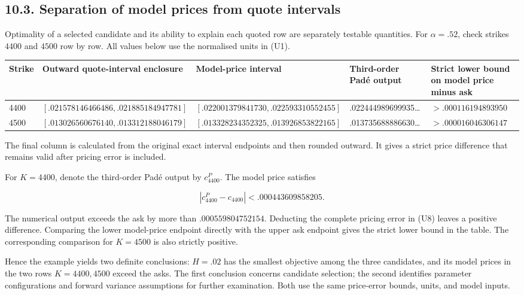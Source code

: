 \documentclass[a4paper,11pt]{article}
\begin{document}
\subsection*{10.3. Separation of model prices from quote intervals}

Optimality of a selected candidate and its ability to explain each quoted row are separately testable quantities. For $\alpha=.52$, check strikes $4400$ and $4500$ row by row. All values below use the normalised units in (U1).

\begingroup\scriptsize\setlength{\tabcolsep}{3pt}
\begin{longtable}{L{0.178000\textwidth}L{0.178000\textwidth}L{0.178000\textwidth}L{0.178000\textwidth}L{0.178000\textwidth}}
Strike & Outward quote-interval enclosure & Model-price interval & Third-order Padé output & Strict lower bound on model price minus ask\\
 & $[.021578146466486,.021885184947781]$ & $[.022001379841730,.022593310552455]$ & .022444989699935… & $>.000116194893950$\\
4500 & $[.013026560676140,.013312188046179]$ & $[.013328234352325,.013926853822165]$ & .013735688886630… & $>.000016046306147$\\
\end{longtable}\endgroup

The final column is calculated from the original exact interval endpoints and then rounded outward. It gives a strict price difference that remains valid after pricing error is included.

For $K=4400$, denote the third-order Padé output by $c^P_{4400}$. The model price satisfies

\[
|c^P_{4400}-c_{4400}|
<.000443609858205.
\tag{U8}
\]

The numerical output exceeds the ask by more than $.000559804752154$. Deducting the complete pricing error in (U8) leaves a positive difference. Comparing the lower model-price endpoint directly with the upper ask endpoint gives the strict lower bound in the table. The corresponding comparison for $K=4500$ is also strictly positive.

Hence the example yields two definite conclusions: $H=.02$ has the smallest objective among the three candidates, and its model prices in the two rows $K=4400,4500$ exceed the asks. The first conclusion concerns candidate selection; the second identifies parameter configurations and forward variance assumptions for further examination. Both use the same price-error bounds, units, and model inputs.
\end{document}
